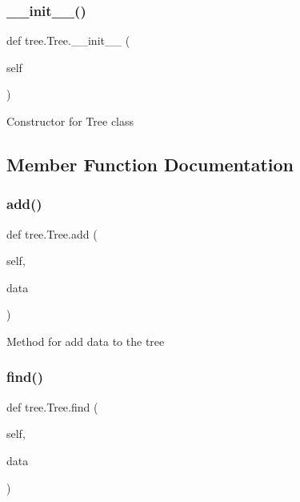 \subsubsection{\texorpdfstring{\+\_\+\+\_\+init\+\_\+\+\_\+()}{\_\_init\_\_()}}
{\footnotesize\ttfamily def tree.\+Tree.\+\_\+\+\_\+init\+\_\+\+\_\+ (\begin{DoxyParamCaption}\item[{}]{self }\end{DoxyParamCaption})}

\begin{DoxyVerb}Constructor for Tree class \end{DoxyVerb}
 

\subsection{Member Function Documentation}
\mbox{\label{classtree_1_1Tree_ac86834d17766cabcf9932921e78f402b}} 
\subsubsection{\texorpdfstring{add()}{add()}}
{\footnotesize\ttfamily def tree.\+Tree.\+add (\begin{DoxyParamCaption}\item[{}]{self,  }\item[{}]{data }\end{DoxyParamCaption})}

\begin{DoxyVerb}Method for add data to the tree \end{DoxyVerb}
 \mbox{\label{classtree_1_1Tree_a1ab25ba4724a490f0e93c12801ab32d2}} 
\subsubsection{\texorpdfstring{find()}{find()}}
{\footnotesize\ttfamily def tree.\+Tree.\+find (\begin{DoxyParamCaption}\item[{}]{self,  }\item[{}]{data }\end{DoxyParamCaption})}

